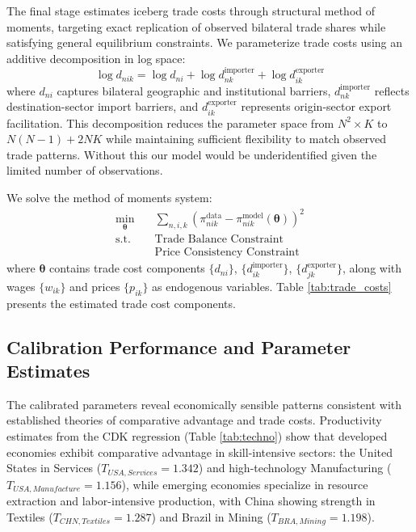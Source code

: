 The final stage estimates iceberg trade costs through structural method of moments, targeting exact replication of observed bilateral trade shares while satisfying general equilibrium constraints. We parameterize trade costs using an additive decomposition in log space:
\begin{equation}
\log d_{nik} = \log d_{ni} + \log d_{nk}^{\text{importer}} + \log d_{ik}^{\text{exporter}}
\end{equation}
where $d_{ni}$ captures bilateral geographic and institutional barriers, $d_{nk}^{\text{importer}}$ reflects destination-sector import barriers, and $d_{ik}^{\text{exporter}}$ represents origin-sector export facilitation. This decomposition reduces the parameter space from $N^2 \times K$ to $N(N-1) + 2NK$ while maintaining sufficient flexibility to match observed trade patterns. Without this our model would be underidentified given the limited number of observations.

We solve the method of moments system:
\begin{align*}
\min_{\boldsymbol{\theta}} &\quad \sum_{n,i,k} \left( \pi_{nik}^{\text{data}} - \pi_{nik}^{\text{model}}(\boldsymbol{\theta}) \right)^2 \\
\text{s.t.} & \quad \text{Trade Balance Constraint} \\
& \quad \text{Price Consistency Constraint}
\end{align*}
where $\boldsymbol{\theta}$ contains trade cost components $\{d_{ni}\}$, $\{d_{ik}^{\text{importer}}\}$, $\{d_{jk}^{\text{exporter}}\}$, along with wages $\{w_{ik}\}$ and prices $\{p_{ik}\}$ as endogenous variables. Table \ref{tab:trade_costs} presents the estimated trade cost components.

\subsection{Calibration Performance and Parameter Estimates}

The calibrated parameters reveal economically sensible patterns consistent with established theories of comparative advantage and trade costs. Productivity estimates from the CDK regression (Table \ref{tab:techno}) show that developed economies exhibit comparative advantage in skill-intensive sectors: the United States in Services ($T_{USA,Services} = 1.342$) and high-technology Manufacturing ($T_{USA,Manufacture} = 1.156$), while emerging economies specialize in resource extraction and labor-intensive production, with China showing strength in Textiles ($T_{CHN,Textiles} = 1.287$) and Brazil in Mining ($T_{BRA,Mining} = 1.198$).

